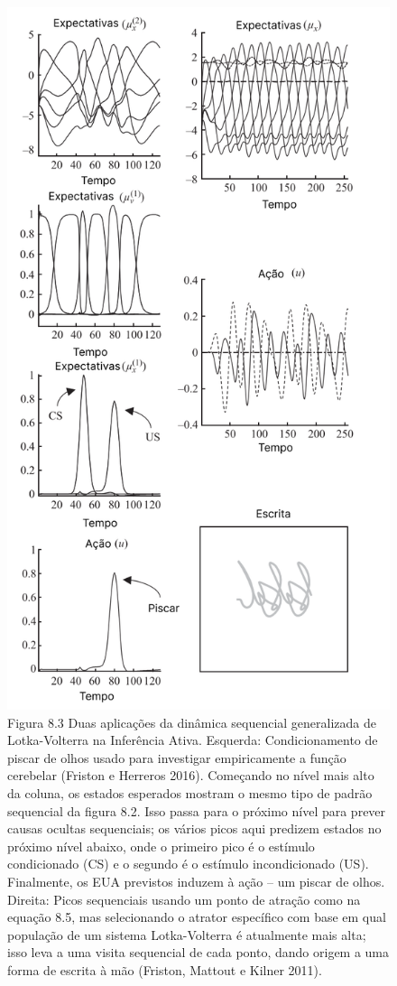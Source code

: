 \documentclass[
  12pt,
]{book}
\begin{document}
\begin{figure}
\centering
\includegraphics{images/Figura_8_3.png}
\caption{Figura 8.3 Duas aplicações da dinâmica sequencial generalizada de Lotka-Volterra na Inferência Ativa. Esquerda: Condicionamento de piscar de olhos usado para investigar empiricamente a função cerebelar (Friston e Herreros 2016). Começando no nível mais alto da coluna, os estados esperados mostram o mesmo tipo de padrão sequencial da figura 8.2. Isso passa para o próximo nível para prever causas ocultas sequenciais; os vários picos aqui predizem estados no próximo nível abaixo, onde o primeiro pico é o estímulo condicionado (CS) e o segundo é o estímulo incondicionado (US). Finalmente, os EUA previstos induzem à ação -- um piscar de olhos. Direita: Picos sequenciais usando um ponto de atração como na equação 8.5, mas selecionando o atrator específico com base em qual população de um sistema Lotka-Volterra é atualmente mais alta; isso leva a uma visita sequencial de cada ponto, dando origem a uma forma de escrita à mão (Friston, Mattout e Kilner 2011).}
\end{figure}
\end{document}
